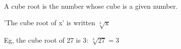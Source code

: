 A cube root is the number whose cube is a given number.
\par
'The cube root of x' is written $ \sqrt[3]{\mathrm{x}} $
\par
Eg, the cube root of 27 is 3: $ \sqrt[3]{27} = 3 $